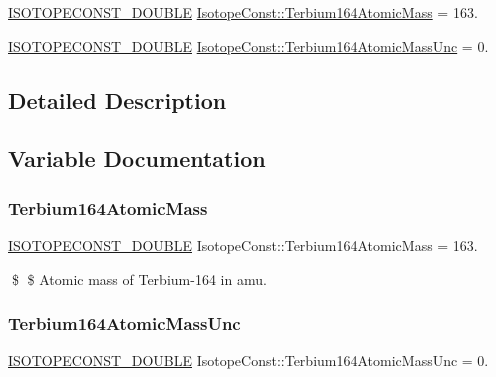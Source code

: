 \begin{DoxyCompactItemize}
\item 
\mbox{\hyperlink{group___isotope_const-_macros_ga8f45a7272ce02c0b4c65c44636ed719a}{I\+S\+O\+T\+O\+P\+E\+C\+O\+N\+S\+T\+\_\+\+D\+O\+U\+B\+LE}} \mbox{\hyperlink{group___isotope_const-_terbium-_tb164_ga0744b171c0db3b2bfd031b6ff2619024}{Isotope\+Const\+::\+Terbium164\+Atomic\+Mass}} = 163.
\item 
\mbox{\hyperlink{group___isotope_const-_macros_ga8f45a7272ce02c0b4c65c44636ed719a}{I\+S\+O\+T\+O\+P\+E\+C\+O\+N\+S\+T\+\_\+\+D\+O\+U\+B\+LE}} \mbox{\hyperlink{group___isotope_const-_terbium-_tb164_ga795803986079e0aa51fc960e296d1a4b}{Isotope\+Const\+::\+Terbium164\+Atomic\+Mass\+Unc}} = 0.
\end{DoxyCompactItemize}


\subsection{Detailed Description}


\subsection{Variable Documentation}
\mbox{\label{group___isotope_const-_terbium-_tb164_ga0744b171c0db3b2bfd031b6ff2619024}} 
\subsubsection{\texorpdfstring{Terbium164\+Atomic\+Mass}{Terbium164AtomicMass}}
{\footnotesize\ttfamily \mbox{\hyperlink{group___isotope_const-_macros_ga8f45a7272ce02c0b4c65c44636ed719a}{I\+S\+O\+T\+O\+P\+E\+C\+O\+N\+S\+T\+\_\+\+D\+O\+U\+B\+LE}} Isotope\+Const\+::\+Terbium164\+Atomic\+Mass = 163.}

\$ \$ Atomic mass of Terbium-\/164 in amu. \mbox{\label{group___isotope_const-_terbium-_tb164_ga795803986079e0aa51fc960e296d1a4b}} 
\subsubsection{\texorpdfstring{Terbium164\+Atomic\+Mass\+Unc}{Terbium164AtomicMassUnc}}
{\footnotesize\ttfamily \mbox{\hyperlink{group___isotope_const-_macros_ga8f45a7272ce02c0b4c65c44636ed719a}{I\+S\+O\+T\+O\+P\+E\+C\+O\+N\+S\+T\+\_\+\+D\+O\+U\+B\+LE}} Isotope\+Const\+::\+Terbium164\+Atomic\+Mass\+Unc = 0.}


